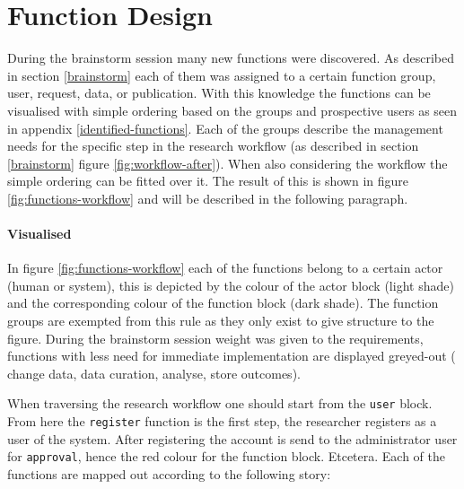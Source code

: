 \section{Function Design}
\label{function-design}

During the brainstorm session many new functions were discovered.
As described in section \ref{brainstorm} each of them was assigned to a certain function group, \ie{} user, request, data, or publication.
With this knowledge the functions can be visualised with simple ordering based on the groups and prospective users as seen in appendix \ref{identified-functions}.
Each of the groups describe the management needs for the specific step in the research workflow (as described in section \ref{brainstorm} figure \ref{fig:workflow-after}).
When also considering the workflow the simple ordering can be fitted over it.
The result of this is shown in figure \ref{fig:functions-workflow} and will be described in the following paragraph.

\paragraph{Visualised}
In figure \ref{fig:functions-workflow} each of the functions belong to a certain actor (human or system), this is depicted by the colour of the actor block (light shade) and the corresponding colour of the function block (dark shade).
The function groups are exempted from this rule as they only exist to give structure to the figure.
During the brainstorm session weight was given to the requirements, functions with less need for immediate implementation are displayed greyed-out (\ie{} change data, data curation, analyse, store outcomes).

When traversing the research workflow one should start from the {\tt user} block.
From here the {\tt register} function is the first step, the researcher registers as a user of the system.
After registering the account is send to the administrator user for {\tt approval}, hence the red colour for the function block.
Etcetera.
Each of the functions are mapped out according to the following story:

